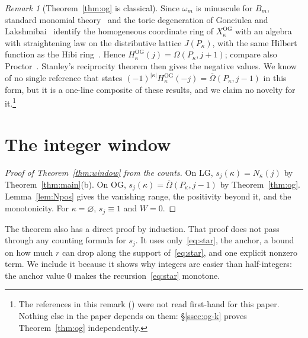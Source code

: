 \documentclass[11pt]{amsart}
\theoremstyle{definition}
\theoremstyle{remark}
\newtheorem{remark}[theorem]{Remark}
\newcommand{\LG}{\mathrm{LG}}
\newcommand{\OG}{\mathrm{OG}}
\newcommand{\Om}{\Omega}
\newcommand{\Omb}{\overline{\Omega}}
\newcommand{\HOG}{H^{\OG}}
\begin{document}
\begin{remark}[Theorem~\ref{thm:og} is classical]\label{rem:og-classical}
Since $\omega_m$ is minuscule for $B_m$, standard monomial theory~\cite{LS86,Seshadri} and the
toric degeneration of Gonciulea and Lakshmibai~\cite{GL96} identify the homogeneous coordinate
ring of $X^{\OG}_\kappa$ with an algebra with straightening law on the distributive lattice
$J(P_\kappa)$, with the same Hilbert function as the Hibi ring~\cite{Hibi87}. Hence
$\HOG_\kappa(j)=\Om(P_\kappa,j+1)$; compare also Proctor~\cite{Proctor84}. Stanley's
reciprocity theorem then gives the negative values. We know of no single reference that states
$(-1)^{|\kappa|}\HOG_\kappa(-j)=\Omb(P_\kappa,j-1)$ in this form, but it is a one-line composite
of these results, and we claim no novelty for it.\footnote{The references in this remark
(\cite{LS86,Seshadri,GL96,Hibi87,Proctor84}) were not read first-hand for this paper. Nothing
else in the paper depends on them: \S\ref{ssec:og-k} proves Theorem~\ref{thm:og}
independently.}
\end{remark}

\section{The integer window}\label{sec:window}

\begin{proof}[Proof of Theorem~\ref{thm:window} from the counts]
On $\LG$, $s_j(\kappa)=N_\kappa(j)$ by Theorem~\ref{thm:main}(b). On $\OG$,
$s_j(\kappa)=\Omb(P_\kappa,j-1)$ by Theorem~\ref{thm:og}. Lemma~\ref{lem:Npos} gives the
vanishing range, the positivity beyond it, and the monotonicity. For $\kappa=\varnothing$,
$s_j\equiv1$ and $W=0$.
\end{proof}

The theorem also has a direct proof by induction. That proof does not pass through any
counting formula for $s_j$. It uses only~\eqref{eq:star}, the anchor, a bound on how much
$r$ can drop along the support of~\eqref{eq:star}, and one explicit nonzero term. We
include it because it shows why integers are easier than half-integers: the anchor value $0$
makes the recursion~\eqref{eq:star} monotone.
\end{document}
